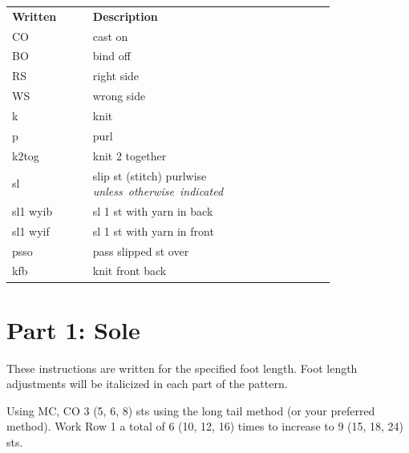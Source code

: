 \documentclass[12pt]{article}
\renewcommand{\arraystretch}{2} %
\newenvironment{frnote}
    {%
    	\setlength{\FrameRule}{1.5pt}
    	\def\FrameCommand{\fboxrule=\FrameRule\fboxsep=\FrameSep \fcolorbox{framecolor}{shadecolor}}
    	\MakeFramed {\FrameRestore}}
    {\setlength{\FrameRule}{1pt}
	\endMakeFramed}
\begin{document}
\begin{titlingpage}
\begin{multicols}{2}
\begin{center}
{\renewcommand{\arraystretch}{1.5}
\begin{tabular}{| C{0.2\linewidth}  p{0.6\linewidth} | }
\thickhline {} 
\textbf{Written}	& \textbf{Description} \\ \thickhline
CO 	& cast on \\
BO 	& bind off \\
RS 	& right side \\
WS 	& wrong side \\
k	&  knit \\
p	& purl   \\
k2tog 	& knit 2 together \\
sl 	& slip st (stitch) purlwise \mbox{\emph{\small unless otherwise indicated}} \\ 
sl1 wyib & sl 1 st with yarn in back \\
sl1 wyif & sl 1 st with yarn in front \\
psso 	& pass slipped st over \\
kfb 	& knit front back \\
\hline
\end{tabular}
}
\end{center}
\end{multicols}
\end{titlingpage}

\section*{Part 1: Sole}

\begin{frnote}
These instructions are written for the specified foot length. Foot length adjustments will be italicized in each part of the pattern.
\end{frnote}

Using MC, CO 3 (5, 6, 8) sts using the long tail method (or your preferred method). Work Row 1 a total of 6 (10, 12, 16) times to increase to 9 (15, 18, 24) sts.
\end{document}
